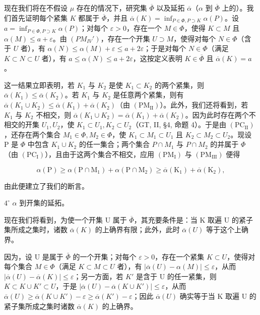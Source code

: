 现在我们将在不假设 \(\mu\) 存在的情况下，研究集 \(\overline{\Phi}\) 以及延拓 \(\overline{\alpha}\)（\(\alpha\) 到 \(\overline{\Phi}\) 上的）。我们首先证明每个紧集 \(K\) 都属于 \(\overline{\Phi}\)，并且 \(\overline{\alpha}(K) = \inf_{P \in \Phi, P \supset K} \alpha(P)\)。设 \(a = \inf_{P \in \Phi, P \supset K} \alpha(P)\)；对每个 \(\varepsilon > 0\)，存在一个 \(M \in \Phi\)，使得 \(K \subset M\) 且 \(\alpha(M) \leqslant a + \varepsilon\)。由 \((PM_{IV}')\)，存在一个开集 \(U \supset M\)，使得对每个 \(N \in \Phi\)（含于 \(U\) 者），有 \(\alpha(N) \leqslant \alpha(M) + \varepsilon \leqslant a + 2\varepsilon\)；于是对每个 \(N \in \Phi\)（满足 \(K \subset N \subset U\) 者），有 \(a \leqslant \alpha(N) \leqslant a + 2\varepsilon\)，这按定义表明 \(K \in \overline{\Phi}\) 且 \(\overline{\alpha}(K) = a\)。

这一结果立即表明，若 \(K_{1}\) 与 \(K_{2}\) 是使 \(K_{1} \subset K_{2}\) 的两个紧集，则 \(\overline{\alpha}(K_{1}) \leqslant \overline{\alpha}(K_{2})\)。若 \(K_{1}\) 与 \(K_{2}\) 是任意两个紧集，则有 \(\overline{\alpha}(K_{1} \cup K_{2}) \leqslant \overline{\alpha}(K_{1}) + \overline{\alpha}(K_{2})\)（由 \((\mathrm{PM}_{\mathrm{II}})\)）。此外，我们还将看到，若 \(K_{1}\) 与 \(K_{2}\) 不相交，则 \(\overline{\alpha}(K_{1} \cup K_{2}) = \overline{\alpha}(K_{1}) + \overline{\alpha}(K_{2})\)。因为此时存在两个不相交的开集 \(U_{1}, U_{2}\)，使 \(K_{1} \subset U_{1}, K_{2} \subset U_{2}\)（GT, II, §4, 命题 4）。于是由 \((\mathrm{PC}_{\mathrm{II}})\)，还存在两个集合 \(M_{1} \in \Phi, M_{2} \in \Phi\)，使 \(K_{1} \subset M_{1} \subset U_{1}\) 且 \(K_{2} \subset M_{2} \subset U_{2}\)。现设 P 是 \(\Phi\) 中包含 \(K_{1} \cup K_{2}\) 的任一集合；两个集合 \(P \cap M_{1}\) 与 \(P \cap M_{2}\) 的并属于 \(\Phi\)（由 \((\mathrm{PC}_{\mathrm{I}})\)），且由于这两个集合不相交，应用 \((\mathrm{PM}_{\mathrm{I}})\) 与 \((\mathrm{PM}_{\mathrm{III}})\) 便得

\[
\alpha (\mathrm{P}) \geqslant \alpha (\mathrm{P} \cap \mathrm{M} _ {1}) + \alpha (\mathrm{P} \cap \mathrm{M} _ {2}) \geqslant \overline {{\alpha}} (\mathrm{K} _ {1}) + \overline {{\alpha}} (\mathrm{K} _ {2}),
\]

由此便建立了我们的断言。

\(4^{\circ}\) \(\alpha\) 到开集的延拓。

现在我们将看到，为使一个开集 U 属于 \(\overline{\Phi}\)，其充要条件是：当 K 取遍 U 的紧子集所成之集时，诸数 \(\overline{\alpha}(K)\) 的上确界有限；此外，此时 \(\overline{\alpha}(U)\) 等于这个上确界。

因为，设 U 是属于 \(\bar{\Phi}\) 的一个开集；对每个 \(\varepsilon > 0\)，存在一个紧集 \(K \subset U\)，使得对每个集合 \(M \in \Phi\)（满足 \(K \subset M \subset U\) 者），有 \(|\overline{\alpha}(U) - \alpha(M)| \leqslant \varepsilon\)，从而 \(|\overline{\alpha}(U) - \overline{\alpha}(K)| \leqslant \varepsilon\)；另一方面，若 \(K'\) 是含于 U 的任一紧集，则 \(K \subset K \cup K' \subset U\)，于是 \(|\overline{\alpha}(U) - \overline{\alpha}(K \cup K')| \leqslant \varepsilon\)，从而 \(\overline{\alpha}(U) \geqslant \overline{\alpha}(K \cup K') - \varepsilon \geqslant \overline{\alpha}(K') - \varepsilon\)；因此 \(\overline{\alpha}(U)\) 确实等于当 K 取遍 U 的紧子集所成之集时诸数 \(\overline{\alpha}(K)\) 的上确界。

